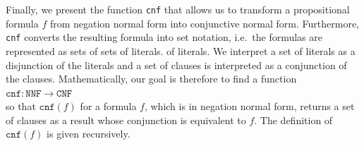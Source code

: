 Finally, we present the function \texttt{cnf} that allows us to transform a propositional formula $f$
from negation normal form into conjunctive normal form.
Furthermore, \texttt{cnf} converts the resulting formula
into set notation, i.e.~the formulas are represented as sets of sets of literals. 
of literals.  We interpret a set of literals as a
disjunction of the literals and a set of clauses is interpreted as a conjunction
of the clauses.  Mathematically, our goal is therefore to find a function
\\[0.2cm]
\hspace*{1.3cm}
$\texttt{cnf}: \texttt{NNF} \rightarrow \texttt{CNF}$
\\[0.2cm]
so that $\texttt{cnf}(f)$ for a formula $f$, which is in negation normal form, returns a set of clauses as a result whose conjunction
is equivalent to $f$.  The definition of $\texttt{cnf}(f)$ is given recursively.
